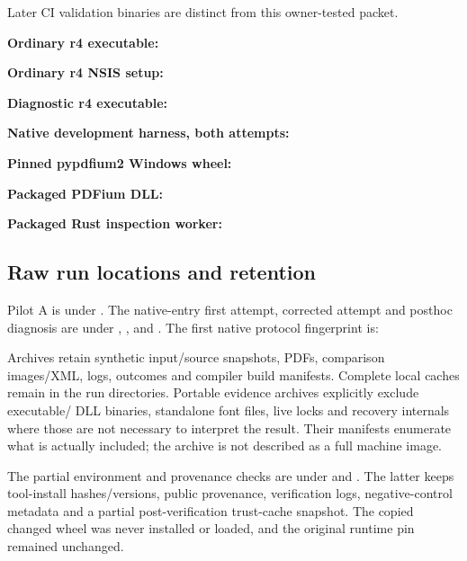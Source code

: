 Later CI validation binaries are distinct from this owner-tested packet.

\textbf{Ordinary r4 executable:}\\

\textbf{Ordinary r4 NSIS setup:}\\

\textbf{Diagnostic r4 executable:}\\

\textbf{Native development harness, both attempts:}\\

\textbf{Pinned pypdfium2 Windows wheel:}\\

\textbf{Packaged PDFium DLL:}\\

\textbf{Packaged Rust inspection worker:}\\

\subsection{Raw run locations and retention}
Pilot A is under .
The native-entry first attempt, corrected attempt and posthoc diagnosis are
under ,
, and
. The first native
protocol fingerprint is:


Archives retain synthetic input/source snapshots, PDFs, comparison images/XML,
logs, outcomes and compiler build manifests. Complete local caches remain in
the run directories. Portable evidence archives explicitly exclude executable/
DLL binaries, standalone font files, live locks and recovery internals where
those are not necessary to interpret the result. Their manifests enumerate
what is actually included; the archive is not described as a full machine image.

The partial environment and provenance checks are under
 and
. The latter keeps tool-install
hashes/versions, public provenance, verification logs, negative-control
metadata and a partial post-verification trust-cache snapshot. The copied
changed wheel was never installed or loaded, and the original runtime pin
remained unchanged.
